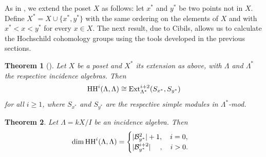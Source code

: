 \documentclass[preprint,review,12pt]{elsarticle}
\newcommand{\Ext}{{\textnormal{Ext}}}
\newcommand{\HH}{{\textnormal{HH}}}
\newcommand{\B}{{\mathcal B}}
\newtheorem{teo}{Theorem}
\begin{document}
As in \cite{C89}, we extend the poset $X$ as follows: let $x^*$ and $y^*$ be two points not in $X$. Define $X^*=X\cup\{x^*,y^*\}$ with the same ordering on the elements of $X$ and with $x^*<x<y^*$  for every $x\in X$. The next result, due to Cibils, allows us to calculate the Hochschild cohomology groups using the tools developed in the previous sections.
	
\begin{teo}[{\cite[p.225]{C89}}]\label{exthochschild}
Let $X$ be a poset and $X^*$ its extension as above, with $\Lambda$ and $\Lambda^{*}$ the respective incidence algebras. Then
	$$\HH^i(\Lambda, \Lambda)\cong \Ext_{\Lambda^*}^{i+2}(S_{x^*},S_{y^*})$$
for all $i\geqslant 1$, where $S_{x^*}$ and $S_{y^*}$ are the respective simple modules in $\Lambda^*$-mod.
\end{teo} 	

\begin{teo}\label{hochschildcohomology}
Let $\Lambda=kX/I$ be an incidence algebra. Then 
	$$\dim\HH^i(\Lambda,\Lambda) = 	
    \begin{cases}
        |\B^{2}_{y^*}|+1, \quad i=0, \\
		|\B^{i+2}_{y^*}|\;\quad,\quad i>0.  
	\end{cases}$$
\end{teo}	
\end{document}
